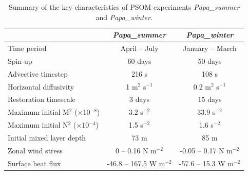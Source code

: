 \documentclass[draft,linenumbers]{agujournal2018}
\begin{document}
\begin{table}[t]
\caption{Summary of the key characteristics of PSOM experiments \textit{Papa\_summer} and \textit{Papa\_winter}.}
	\label{tab: meso_vs_submeso}
	\centering
 \centering
\begin{tabular}{|l|c|c|}
		\hline
											& \textit{Papa\_summer} & \textit{Papa\_winter} \\
		\hline
		Time period 								& April -- July             & January -- March          \\
		Spin-up								        & 60 days                   & 50 days                   \\
		Advective timestep				            & 216 s                     & 108 s                     \\
		Horizontal diffusivity			            & 1 m$^2$ s$^{-1}$          & 0.2 m$^2$ s$^{-1}$        \\
		Restoration timescale			            & 3 days                    & 15 days                   \\
		Maximum initial M$^2$ ($\times$10$^{-8}$)	& 3.2 s$^{-2}$             & 33.9 s$^{-2}$             \\	
		Maximum initial N$^2$ ($\times$10$^{-4}$)	& 1.5 s$^{-2}$              & 1.6 s$^{-2}$              \\
		Initial mixed layer depth                   & 73 m                      & 85 m                      \\
		Zonal wind stress                	        & 0 -- 0.16 N m$^{-2}$      & -0.05 -- 0.17 N m$^{-2}$  \\	
		Surface heat flux               	        & -46.8 -- 167.5 W m$^{-2}$ & -57.6 -- 15.3 W m$^{-2}$  \\	
		\hline
	\end{tabular}
\end{table}

\end{document}
